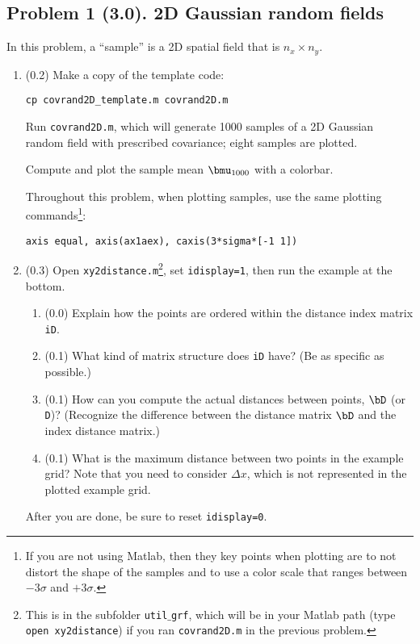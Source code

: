 \documentclass[11pt,titlepage,fleqn]{article}
\begin{document}

\pagebreak
\subsection*{Problem 1 (3.0). 2D Gaussian random fields}

In this problem, a ``sample'' is a 2D spatial field that is $n_x \times n_y$.
%
\begin{enumerate}
\item (0.2) Make a copy of the template code:
%
\begin{verbatim}
cp covrand2D_template.m covrand2D.m
\end{verbatim}
%
Run \verb+covrand2D.m+, which will generate 1000 samples of a 2D Gaussian random field with prescribed covariance; eight samples are plotted.

Compute and plot the sample mean $\bmu_{1000}$ with a colorbar.

Throughout this problem, when plotting samples, use the same plotting commands\footnote{If you are not using Matlab, then they key points when plotting are to not distort the shape of the samples and to use a color scale that ranges between $-3\sigma$ and $+3\sigma$.}:

\verb+axis equal, axis(ax1aex), caxis(3*sigma*[-1 1])+

\item (0.3) Open \verb+xy2distance.m+\footnote{This is in the subfolder {\tt util$\_$grf}, which will be in your Matlab path (type {\tt open xy2distance}) if you ran {\tt covrand2D.m} in the previous problem.}, set \verb+idisplay=1+, then run the example at the bottom.
%
\begin{enumerate}
\item (0.0) Explain how the points are ordered within the distance index matrix \verb+iD+.
\item (0.1) What kind of matrix structure does \verb+iD+ have? (Be as specific as possible.)
\item (0.1) How can you compute the actual distances between points, $\bD$ (or \verb+D+)? 
(Recognize the difference between the distance matrix $\bD$ and the index distance matrix.)
\item (0.1) What is the maximum distance between two points in the example grid?
Note that you need to consider $\Delta x$, which is not represented in the plotted example grid.
\end{enumerate}
%
After you are done, be sure to reset \verb+idisplay=0+.


\end{enumerate}
\end{document}
